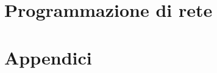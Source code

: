 \documentclass[10pt,twoside]{book}
\begin{document}
\part{Programmazione di rete}
\label{part:progr-di-rete}







\appendix

\part{Appendici}
\label{part:appendici}







\backmatter
\printindex
%
%


\end{document}
